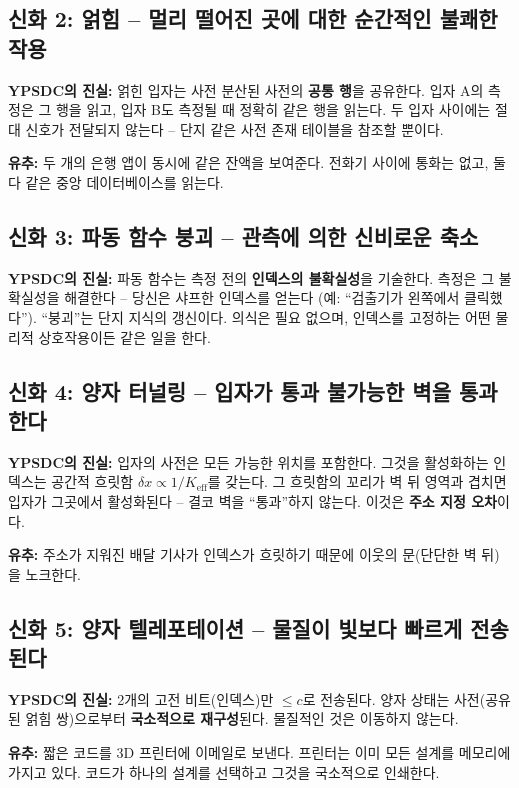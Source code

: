 \documentclass[12pt,a4paper]{article}
\begin{document}
	\subsection{신화 2: 얽힘 – 멀리 떨어진 곳에 대한 순간적인 불쾌한 작용}
	\textbf{YPSDC의 진실:} 얽힌 입자는 사전 분산된 사전의 \textbf{공통 행}을 공유한다. 입자 A의 측정은 그 행을 읽고, 입자 B도 측정될 때 정확히 같은 행을 읽는다. 두 입자 사이에는 절대 신호가 전달되지 않는다 – 단지 같은 사전 존재 테이블을 참조할 뿐이다.
	\par
	\textbf{유추:} 두 개의 은행 앱이 동시에 같은 잔액을 보여준다. 전화기 사이에 통화는 없고, 둘 다 같은 중앙 데이터베이스를 읽는다.
	
	\subsection{신화 3: 파동 함수 붕괴 – 관측에 의한 신비로운 축소}
	\textbf{YPSDC의 진실:} 파동 함수는 측정 전의 \textbf{인덱스의 불확실성}을 기술한다. 측정은 그 불확실성을 해결한다 – 당신은 샤프한 인덱스를 얻는다 (예: “검출기가 왼쪽에서 클릭했다”). “붕괴”는 단지 지식의 갱신이다. 의식은 필요 없으며, 인덱스를 고정하는 어떤 물리적 상호작용이든 같은 일을 한다.
	
	\subsection{신화 4: 양자 터널링 – 입자가 통과 불가능한 벽을 통과한다}
	\textbf{YPSDC의 진실:} 입자의 사전은 모든 가능한 위치를 포함한다. 그것을 활성화하는 인덱스는 공간적 흐릿함 \(\delta x \propto 1/K_{\mathrm{eff}}\)를 갖는다. 그 흐릿함의 꼬리가 벽 뒤 영역과 겹치면 입자가 그곳에서 활성화된다 – 결코 벽을 “통과”하지 않는다. 이것은 \textbf{주소 지정 오차}이다.
	\par
	\textbf{유추:} 주소가 지워진 배달 기사가 인덱스가 흐릿하기 때문에 이웃의 문(단단한 벽 뒤)을 노크한다.
	
	\subsection{신화 5: 양자 텔레포테이션 – 물질이 빛보다 빠르게 전송된다}
	\textbf{YPSDC의 진실:} 2개의 고전 비트(인덱스)만 \(\le c\)로 전송된다. 양자 상태는 사전(공유된 얽힘 쌍)으로부터 \textbf{국소적으로 재구성}된다. 물질적인 것은 이동하지 않는다.
	\par
	\textbf{유추:} 짧은 코드를 3D 프린터에 이메일로 보낸다. 프린터는 이미 모든 설계를 메모리에 가지고 있다. 코드가 하나의 설계를 선택하고 그것을 국소적으로 인쇄한다.
	
\end{document}

